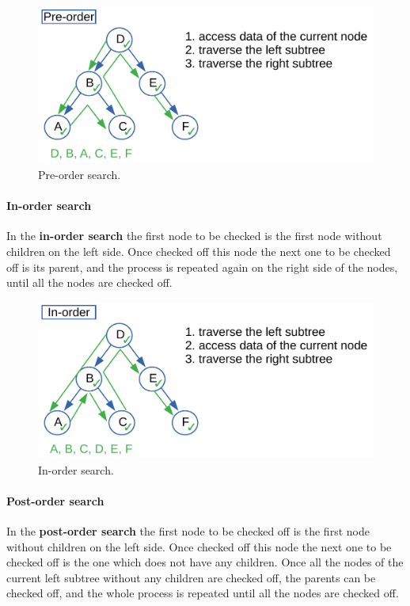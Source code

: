 \begin{figure}[H]
	\begin{center}
		\includegraphics[scale=.6]{chapters/trees/images/trees_5.pdf}
		\caption[Pre-order search.]{Pre-order search.}
		\label{trees_5}
	\end{center}
\end{figure}

\paragraph{In-order search}
\label{inorder}
In the \textbf{in-order search} the first node to be checked is the first node without children on the left side. Once checked off this node the next one to be checked off is its parent, and the process is repeated again on the right side of the nodes, until all the nodes are checked off.

\begin{figure}[H]
	\begin{center}
		\includegraphics[scale=.6]{chapters/trees/images/trees_6.pdf}
		\caption[In-order search.]{In-order search.}
		\label{trees_6}
	\end{center}
\end{figure}

\paragraph{Post-order search}
\label{postorder}
In the \textbf{post-order search} the first node to be checked off is the first node without children on the left side. Once checked off this node the next one to be checked off is the one which does not have any children. Once all the nodes of the current left subtree without any children are checked off, the parents can be checked off, and the whole process is repeated until all the nodes are checked off.

